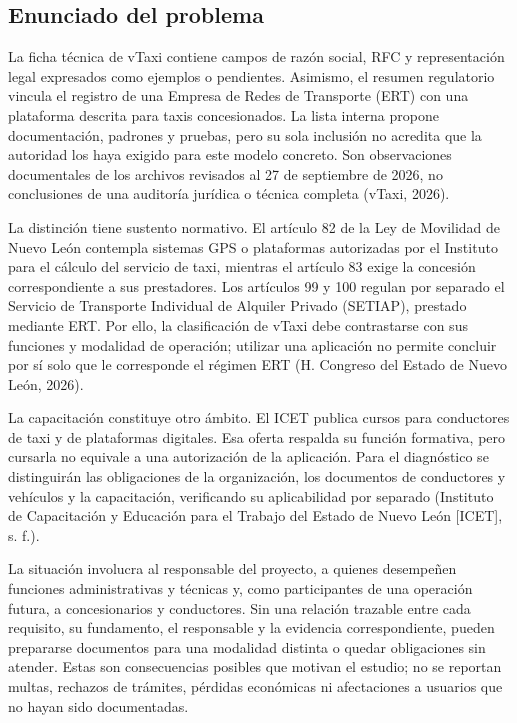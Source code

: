 {\subsection{Enunciado del problema}
La ficha técnica de vTaxi contiene campos de razón social, RFC y representación legal expresados como ejemplos o pendientes. Asimismo, el resumen regulatorio vincula el registro de una Empresa de Redes de Transporte (ERT) con una plataforma descrita para taxis concesionados. La lista interna propone documentación, padrones y pruebas, pero su sola inclusión no acredita que la autoridad los haya exigido para este modelo concreto. Son observaciones documentales de los archivos revisados al 27 de septiembre de 2026, no conclusiones de una auditoría jurídica o técnica completa (vTaxi, 2026).


La distinción tiene sustento normativo. El artículo 82 de la Ley de Movilidad de Nuevo León contempla sistemas GPS o plataformas autorizadas por el Instituto para el cálculo del servicio de taxi, mientras el artículo 83 exige la concesión correspondiente a sus prestadores. Los artículos 99 y 100 regulan por separado el Servicio de Transporte Individual de Alquiler Privado (SETIAP), prestado mediante ERT. Por ello, la clasificación de vTaxi debe contrastarse con sus funciones y modalidad de operación; utilizar una aplicación no permite concluir por sí solo que le corresponde el régimen ERT (H. Congreso del Estado de Nuevo León, 2026).


La capacitación constituye otro ámbito. El ICET publica cursos para conductores de taxi y de plataformas digitales. Esa oferta respalda su función formativa, pero cursarla no equivale a una autorización de la aplicación. Para el diagnóstico se distinguirán las obligaciones de la organización, los documentos de conductores y vehículos y la capacitación, verificando su aplicabilidad por separado (Instituto de Capacitación y Educación para el Trabajo del Estado de Nuevo León [ICET], s. f.).


La situación involucra al responsable del proyecto, a quienes desempeñen funciones administrativas y técnicas y, como participantes de una operación futura, a concesionarios y conductores. Sin una relación trazable entre cada requisito, su fundamento, el responsable y la evidencia correspondiente, pueden prepararse documentos para una modalidad distinta o quedar obligaciones sin atender. Estas son consecuencias posibles que motivan el estudio; no se reportan multas, rechazos de trámites, pérdidas económicas ni afectaciones a usuarios que no hayan sido documentadas.


}
